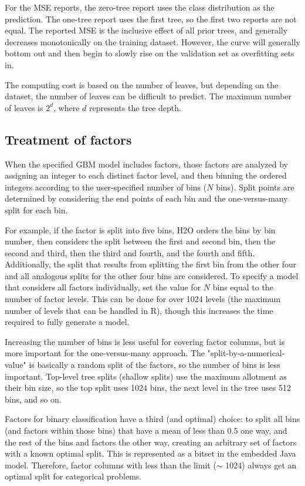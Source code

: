 For the MSE reports, the zero-tree report uses the class distribution as the prediction. The one-tree report
uses the first tree, so the first two reports are not equal. The reported MSE is the inclusive effect of all
prior trees, and generally decreases monotonically on the training dataset. However, the curve will generally
bottom out and then begin to slowly rise on the validation set as overfitting sets in.

The computing cost is based on the number of leaves, but depending on the dataset, the number of leaves can be
difficult to predict. The maximum number of leaves is $2^d$, where $d$ represents the tree depth.

\subsection{Treatment of factors}

When the specified GBM model includes factors, those factors are analyzed by assigning an integer to each distinct
factor level, and then binning the ordered integers according to the user-specified number of bins ($N$ bins). Split
points are determined by considering the end points of each bin and the one-versus-many split for each bin.

For example, if the factor is split into five bins, H2O orders the bins by bin number, then considers the split between the first and second bin, then the second and third, then the third and fourth, and the fourth and fifth.
Additionally, the split that results from splitting the first bin from the other four and all analogous splits for
the other four bins are considered. To specify a model that considers all factors individually, set the value for
$N$ bins equal to the number of factor levels. This can be done for over 1024 levels (the maximum number of levels
that can be handled in R), though this increases the time required to fully generate a model.

Increasing the number of bins is less useful for covering factor columns, but is more important for the
one-versus-many approach. The "split-by-a-numerical-value" is basically a random split of the factors, so the
number of bins is less important. Top-level tree splits (shallow splits) use the maximum allotment as their bin size,
so the top split uses 1024 bins, the next level in the tree uses 512 bins, and so on.

Factors for binary classification have a third (and optimal) choice: to split all bins (and factors within those bins)
that have a mean of less than 0.5 one way, and the rest of the bins and factors the other way, creating an arbitrary
set of factors with a known optimal split. This is represented as a bitset in the embedded Java model. Therefore,
factor columns with less than the limit ($\mathtt{\sim}$ 1024) always get an optimal split for categorical problems.

